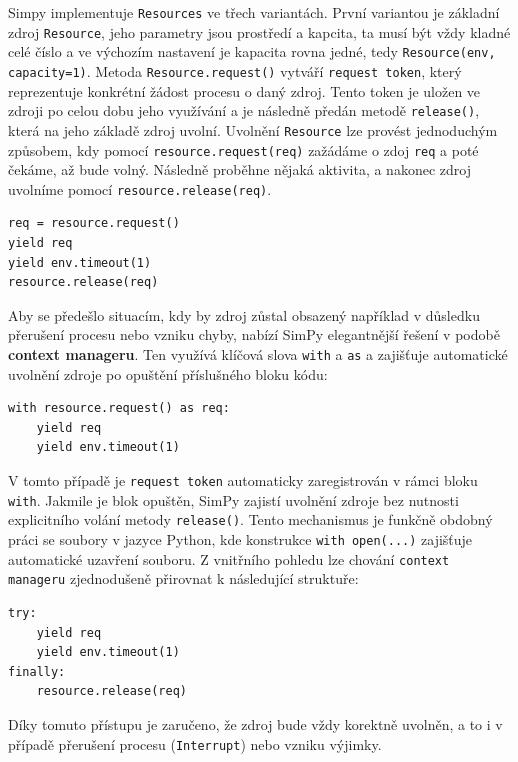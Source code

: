 \documentclass[
  program=itp,
  biblatex,
  figures=false,
  glossaries,
  index
]{kidiplom}
\begin{document}
Simpy implementuje \texttt{Resources} ve třech variantách. První variantou je základní zdroj \texttt{Resource}, jeho parametry jsou prostředí a kapcita, ta musí být vždy kladné celé číslo a ve výchozím nastavení je kapacita rovna jedné, tedy \texttt{Resource(env, capacity=1)}. Metoda \texttt{Resource.request()} vytváří \texttt{request token}, který reprezentuje konkrétní žádost procesu o daný zdroj. Tento token je uložen ve zdroji po celou dobu jeho využívání a je následně předán metodě \texttt{release()}, která na jeho základě zdroj uvolní.  Uvolnění \texttt{Resource} lze provést jednoduchým způsobem, kdy pomocí \texttt{resource.request(req)} zažádáme o zdoj \texttt{req} a poté čekáme, až bude volný. Následně proběhne nějaká aktivita, a nakonec zdroj uvolníme pomocí \texttt{resource.release(req)}.

\begin{verbatim}
req = resource.request()  
yield req              
yield env.timeout(1)
resource.release(req)      
\end{verbatim}

Aby se předešlo situacím, kdy by zdroj zůstal obsazený například v důsledku přerušení procesu nebo vzniku chyby, nabízí SimPy elegantnější řešení v podobě \textbf{context manageru}. Ten využívá klíčová slova \texttt{with} a \texttt{as} a zajišťuje automatické uvolnění zdroje po opuštění příslušného bloku kódu:

\begin{verbatim}
with resource.request() as req:
    yield req              
    yield env.timeout(1)
\end{verbatim}

V tomto případě je \texttt{request token} automaticky zaregistrován v rámci bloku \texttt{with}. Jakmile je blok opuštěn, SimPy zajistí uvolnění zdroje bez nutnosti explicitního volání metody \texttt{release()}. Tento mechanismus je funkčně obdobný práci se soubory v jazyce Python, kde konstrukce \texttt{with open(...)} zajišťuje automatické uzavření souboru. Z vnitřního pohledu lze chování \texttt{context manageru} zjednodušeně přirovnat k následující struktuře:

\begin{verbatim}
try:
    yield req
    yield env.timeout(1)
finally:
    resource.release(req)
\end{verbatim}

Díky tomuto přístupu je zaručeno, že zdroj bude vždy korektně uvolněn, a to i v případě přerušení procesu (\texttt{Interrupt}) nebo vzniku výjimky. 
\end{document}
